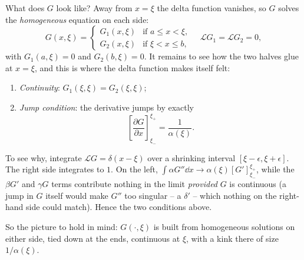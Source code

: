 What does $G$ look like? Away from $x = \xi$ the delta function vanishes, so $G$ solves the \emph{homogeneous} equation on each side:
$$
G(x, \xi) = \begin{cases}
    G_1(x, \xi) &\mbox{if } a \leq x < \xi, \\
    G_2(x, \xi) &\mbox{if } \xi < x \leq b,
\end{cases}
\quad \mathcal{L}G_1 = \mathcal{L}G_2 = 0,
$$
with $G_1(a, \xi) = 0$ and $G_2(b, \xi) = 0$. It remains to see how the two halves glue at $x = \xi$, and this is where the delta function makes itself felt:
\begin{enumerate}[label=(\roman*)]
    \item \emph{Continuity}: $G_1(\xi, \xi) = G_2(\xi, \xi)$;
    \item \emph{Jump condition}: the derivative jumps by exactly
    $$
    \left[\frac{\partial G}{\partial x}\right]_{\xi_-}^{\xi_+} = \frac{1}{\alpha(\xi)}.
    $$
\end{enumerate}
To see why, integrate $\mathcal{L}G = \delta(x - \xi)$ over a shrinking interval $[\xi - \epsilon, \xi + \epsilon]$. The right side integrates to $1$. On the left, $\int \alpha G'' \dd x \rightarrow \alpha(\xi) [G']^{\xi_+}_{\xi_-}$, while the $\beta G'$ and $\gamma G$ terms contribute nothing in the limit \emph{provided} $G$ is continuous (a jump in $G$ itself would make $G''$ too singular -- a $\delta'$ -- which nothing on the right-hand side could match). Hence the two conditions above.

So the picture to hold in mind: $G(\cdot, \xi)$ is built from homogeneous solutions on either side, tied down at the ends, continuous at $\xi$, with a kink there of size $1/\alpha(\xi)$.

\begin{center}
\end{center}

